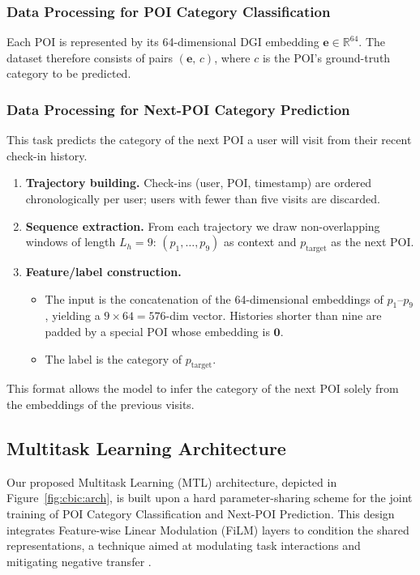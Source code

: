 \subsubsection{Data Processing for POI Category Classification}
Each POI is represented by its 64-dimensional DGI embedding $\mathbf{e}\!\in\!\mathbb{R}^{64}$.
The dataset therefore consists of pairs $(\mathbf{e},\,c)$, where $c$ is the POI's ground-truth category to be predicted.

\subsubsection{Data Processing for Next-POI Category Prediction}
This task predicts the category of the next POI a user will visit from their recent check-in history.

\begin{enumerate}
  \item \textbf{Trajectory building.}  Check-ins (user, POI, timestamp) are ordered chronologically per user; users with fewer than five visits are discarded.
  \item \textbf{Sequence extraction.}  From each trajectory we draw non-overlapping windows of length $L_h\!=\!9$: $(p_1,\dots,p_9)$ as context and $p_{\text{target}}$ as the next POI.
  \item \textbf{Feature/label construction.}
    \begin{itemize}
      \item The input is the concatenation of the 64-dimensional embeddings of $p_1$--$p_9$, yielding a $9\!\times\!64=576$-dim vector.
            Histories shorter than nine are padded by a special POI whose embedding is $\mathbf{0}$.
      \item The label is the category of $p_{\text{target}}$.
    \end{itemize}
\end{enumerate}

This format allows the model to infer the category of the next POI solely from the embeddings of the previous visits.

\subsection{Multitask Learning Architecture}
\label{sec:cbic:mtlarch}

Our proposed Multitask Learning (MTL) architecture, depicted in Figure~\ref{fig:cbic:arch}, is built upon a hard parameter-sharing scheme for the joint training of POI Category Classification and Next-POI Prediction. This design integrates Feature-wise Linear Modulation (FiLM) layers to condition the shared representations, a technique aimed at modulating task interactions and mitigating negative transfer \cite{perez2018film,standley2020tasks}.

